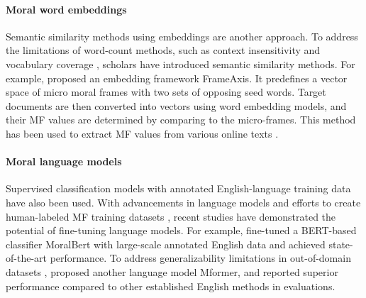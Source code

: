 
\paragraph{Moral word embeddings} 
Semantic similarity methods using embeddings are another approach. To address the limitations of word-count methods, such as context insensitivity and vocabulary coverage \citep{nguyen2024measuring}, scholars have introduced semantic similarity methods. For example, \citet{kwak2021frameaxis} proposed an embedding framework FrameAxis. It predefines a vector space of micro moral frames with two sets of opposing seed words. Target documents are then converted into vectors using word embedding models, and their MF values are determined by comparing to the micro-frames. This method has been used to extract MF values from various online texts \citep[e.g.,][]{mokhberian2020moral,jing2021characterizing}. %

\paragraph{Moral language models} 
Supervised classification models with annotated English-language training data have also been used. With advancements in language models and efforts to create human-labeled MF training datasets \citep{hoover2020moral, trager2022moral}, recent studies have demonstrated the potential of fine-tuning language models. For example, \citet{preniqi2024moralbert} fine-tuned a BERT-based classifier MoralBert with large-scale annotated English data and achieved state-of-the-art performance. To address generalizability limitations in out-of-domain datasets \citep{liscio2022cross}, \citet{nguyen2024measuring} proposed another language model Mformer, and reported superior performance compared to other established English methods in evaluations. 

